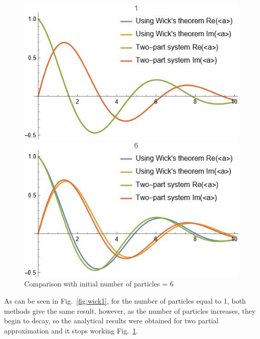 \documentclass[12pt]{article}
\theoremstyle{definition}
\begin{document}
	\begin{figure}[h!]
		\begin{center}
			\begin{minipage}[h]{0.45\linewidth}
				\includegraphics[width=1\linewidth]{Wickn0=1.JPG}
				\caption{Comparison with initial number of particles = 1}
				\label{fig:wick1}
			\end{minipage}
			\hfil
			\begin{minipage}[h]{0.45\linewidth}
				\includegraphics[width=1\linewidth]{Wickn0=6.JPG}
				\caption{Comparison with initial number of particles = 6}
				\label{fig:wick6}
			\end{minipage}
		\end{center}
	\end{figure}
	
	As can be seen in Fig.~\ref{fig:wick1}, for the number of particles equal to 1, both methods give the same result, however, as the number of particles increases, they begin to decay, so the analytical results were obtained for two partial approximation and it stops working Fig.~\ref{fig:wick6}.
	
\end{document}
